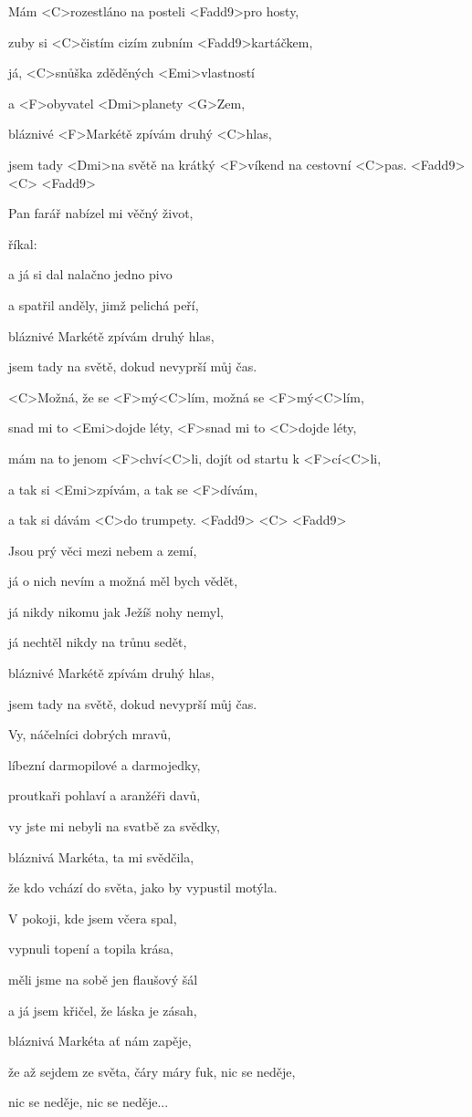 

\zs
Mám <C>rozestláno na posteli <Fadd9>pro hosty,

zuby si <C>čistím cizím zubním <Fadd9>kartáčkem,

já, <C>snůška zděděných <Emi>vlastností

a <F>obyvatel <Dmi>planety <G>Zem,

bláznivé <F>Markétě zpívám druhý <C>hlas,

jsem tady <Dmi>na světě na krátký <F>víkend na cestovní <C>pas. 
<Fadd9> <C> <Fadd9>
\ks

\zs
Pan farář nabízel mi věčný život,

říkal: 

a já si dal nalačno jedno pivo

a spatřil anděly, jimž pelichá peří,

bláznivé Markétě zpívám druhý hlas,

jsem tady na světě, dokud nevyprší můj čas.
\ks

\zr
<C>Možná, že se <F>mý<C>lím, možná se <F>mý<C>lím,

snad mi to <Emi>dojde léty, <F>snad mi to <C>dojde léty,

mám na to jenom <F>chví<C>li, dojít od startu k <F>cí<C>li,

a tak si <Emi>zpívám, a tak se <F>dívám,

a tak si dávám <C>do trumpety. <Fadd9> <C> <Fadd9>
\kr

\zs
Jsou prý věci mezi nebem a zemí,

já o nich nevím a možná měl bych vědět,

já nikdy nikomu jak Ježíš nohy nemyl,

já nechtěl nikdy na trůnu sedět,

bláznivé Markétě zpívám druhý hlas,

jsem tady na světě, dokud nevyprší můj čas.
\ks

\zs
Vy, náčelníci dobrých mravů,

líbezní darmopilové a darmojedky,

proutkaři pohlaví a aranžéři davů,

vy jste mi nebyli na svatbě za svědky,

bláznivá Markéta, ta mi svědčila,

že kdo vchází do světa, jako by vypustil motýla.
\ks

\zr \kr


\zs
V pokoji, kde jsem včera spal,

vypnuli topení a topila krása,

měli jsme na sobě jen flaušový šál

a já jsem křičel, že láska je zásah,

bláznivá Markéta ať nám zapěje,

že až sejdem ze světa, čáry máry fuk, nic se neděje,

nic se neděje, nic se neděje...
\ks

\kp
